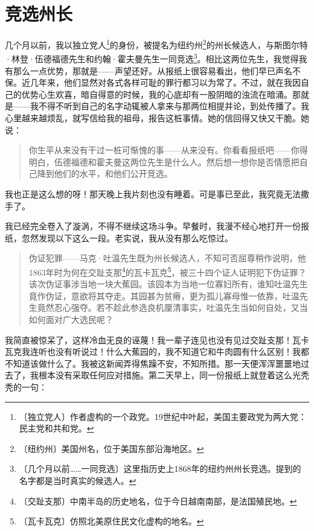 \documentclass[12pt,UTF-8,openany]{ctexbook}
\begin{document}
\chapter{竞选州长}

\begin{large}
    
    几个月以前，我以独立党人\footnote{〔独立党人〕作者虚构的一个政党。19世纪中叶起，美国主要政党为两大党：民主党和共和党。}的身份，被提名为纽约州\footnote{〔纽约州〕美国州名，位于美国东部沿海地区。}的州长候选人，与斯图尔特·林登·伍德福德先生和约翰·霍夫曼先生一同竞选\footnote{〔几个月以前……一同竞选〕这里指历史上1868年的纽约州州长竞选。提到的名字都是当时真实的候选人。}。相比这两位先生，我觉得我有那么一点优势，那就是——声望还好。从报纸上很容易看出，他们早已声名不保。近几年来，他们显然对各式各样可耻的罪行都习以为常了。不过，就在我因自己的优势心生欢喜，暗自得意的时候，我的心底却有一股阴暗的浊流在暗涌。那就是——我不得不听到自己的名字动辄被人拿来与那两位相提并论，到处传播了。我心里越来越烦乱，就写信给我的祖母，报告这桩事情。她的信回得又快又干脆。她说：
    
    \begin{quotation}
    
    你生平从来没有干过一桩可惭愧的事——从来没有。你看看报纸吧——你得明白，伍德福德和霍夫曼这两位先生是什么人。然后想一想你是否情愿把自己降到他们的水平，和他们公开竞选。
    
    \end{quotation}
    
    我也正是这么想的呀！那天晚上我片刻也没有睡着。可是事已至此，我究竟无法撒手了。
    
    我已经完全卷入了漩涡，不得不继续这场斗争。早餐时，我漫不经心地打开一份报纸，忽然发现以下这么一段。老实说，我从没有那么吃惊过。
    
    \begin{quotation}
    
    伪证犯罪——马克·吐温先生既为州长候选人，不知可否屈尊稍作说明，他1863年时为何在交趾支那\footnote{〔交趾支那〕中南半岛的历史地名，位于今日越南南部，是法国殖民地。}的瓦卡瓦克\footnote{〔瓦卡瓦克〕仿照北美原住民文化虚构的地名。}，被三十四个证人证明犯下伪证罪？该次伪证事涉当地一块大蕉园。该园本为当地一位寡妇所有，谁知吐温先生竟作伪证，意欲将其夺走。其园甚为贫瘠，更为孤儿寡母惟一依靠，吐温先生竟然忍心强夺。若不趁此参选良机厘清事实，吐温先生当如何自处，又当如何面对广大选民呢？
    
    \end{quotation}
    
    我简直被惊呆了，这样冷血无良的诬蔑！我一辈子连见也没有见过交趾支那！瓦卡瓦克我连听也没有听说过！什么大蕉园的，我不知道它和牛肉圆有什么区别！我都不知道该做什么了。我被这新闻弄得焦躁不安，不知所措。那一天便浑浑噩噩地过去了，我根本没有采取任何应对措施。第二天早上，同一份报纸上就登着这么光秃秃的一句：
    

\end{large}
\end{document}
